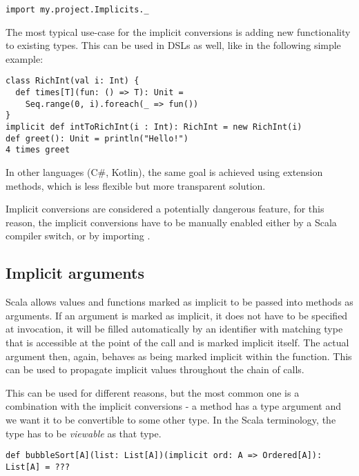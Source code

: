 \lstset{style=Scala}
\begin{lstlisting}
import my.project.Implicits._
\end{lstlisting}

The most typical use-case for the implicit conversions is adding new functionality to existing types. This can be used in DSLs as well, like in the following simple example:

\lstset{style=Scala}
\begin{lstlisting}
class RichInt(val i: Int) {
  def times[T](fun: () => T): Unit =
    Seq.range(0, i).foreach(_ => fun())
}
implicit def intToRichInt(i : Int): RichInt = new RichInt(i)
def greet(): Unit = println("Hello!")
4 times greet
\end{lstlisting}

In other languages (C\#, Kotlin), the same goal is achieved using extension methods, which is less flexible but more transparent solution.

Implicit conversions are considered a potentially dangerous feature, for this reason, the implicit conversions have to be manually enabled either by a Scala compiler switch, or by importing .

\subsection{Implicit arguments}
\label{subsec:implicit_args}

Scala allows values and functions marked as implicit to be passed into methods as arguments. If an argument is marked as implicit, it does not have to be specified at invocation, it will be filled automatically by an identifier with matching type that is accessible at the point of the call and is marked implicit itself. The actual argument then, again, behaves as being marked implicit within the function. This can be used to propagate implicit values throughout the chain of calls.

This can be used for different reasons, but the most common one is a combination with the implicit conversions - a method has a type argument and we want it to be convertible to some other type. In the Scala terminology, the type has to be \textit{viewable} as that type.

\lstset{style=Scala}
\begin{lstlisting}
def bubbleSort[A](list: List[A])(implicit ord: A => Ordered[A]): List[A] = ???
\end{lstlisting}

